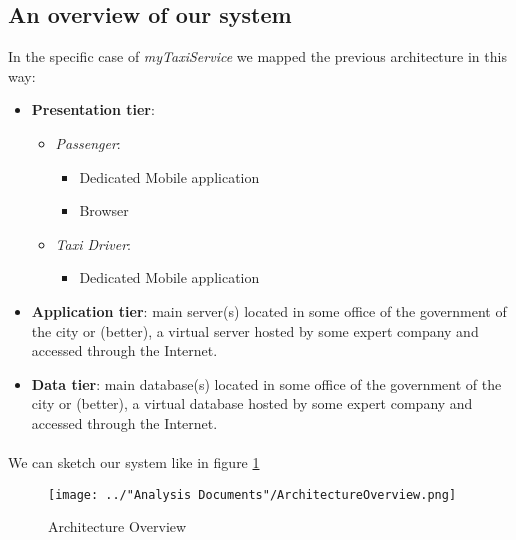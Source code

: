 \subsection{An overview of our system}
In the specific case of \textit{myTaxiService} we mapped the previous architecture in this way:
\begin{itemize}
	\item \textbf{Presentation tier}:
	\begin{itemize}
		\item \textit{Passenger}:
		\begin{itemize}
			\item Dedicated Mobile application
			\item Browser
		\end{itemize}
		\item \textit{Taxi Driver}:
		\begin{itemize}
			\item Dedicated Mobile application
		\end{itemize}
	\end{itemize}
	\item \textbf{Application tier}: main server(s) located in some office of the government of the city or (better), a virtual server hosted by some expert company and accessed through the Internet.
	\item \textbf{Data tier}: main database(s) located in some office of the government of the city or (better), a virtual database hosted by some expert company and accessed through the Internet. 
\end{itemize}
\paragraph{}We can sketch our system like in figure \ref{fig:architectureOverview}
\begin{figure}
	\centering
	\texttt{[image: ../"Analysis Documents"/ArchitectureOverview.png]}
	\label{fig:architectureOverview}
	\caption{Architecture Overview}
\end{figure}
